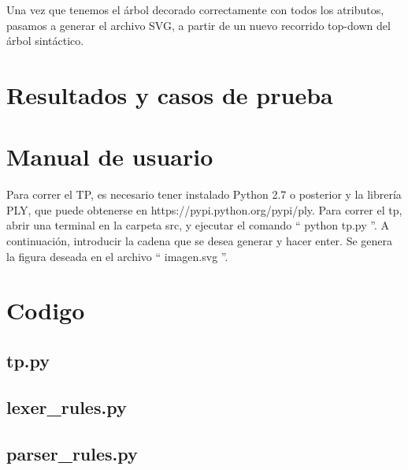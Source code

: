 \documentclass[a4paper, 10pt, twoside]{article}
\begin{document}
Una vez que tenemos el árbol decorado correctamente con todos los atributos, pasamos a generar el archivo SVG, a partir de un nuevo recorrido top-down del árbol sintáctico.

\section{Resultados y casos de prueba}


\section{Manual de usuario}
Para correr el TP, es necesario tener instalado Python 2.7 o posterior y la librería PLY, que puede obtenerse en https://pypi.python.org/pypi/ply. Para correr el tp, abrir una terminal en la carpeta src, y ejecutar el comando `` python tp.py ''. A continuación, introducir la cadena que se desea generar y hacer enter. Se genera la figura deseada en el archivo `` imagen.svg ''.


\section{Codigo}


\subsection{tp.py}


\subsection{lexer_rules.py}


\subsection{parser_rules.py}

\end{document}
